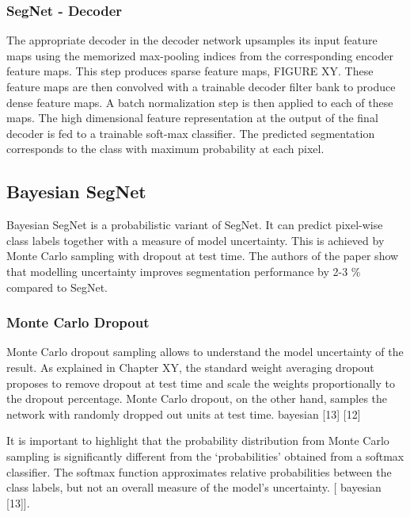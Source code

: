 \subsubsection{SegNet - Decoder}

The appropriate decoder in the decoder network upsamples its input feature maps using the memorized max-pooling indices from the corresponding encoder feature maps. This step produces sparse feature maps, FIGURE XY. These feature maps are then convolved with a trainable decoder filter bank to produce dense feature maps. A batch normalization step is then applied to each of these maps. The high dimensional feature representation at the output of the final decoder is fed to a trainable soft-max classifier. The predicted segmentation corresponds to the class with maximum probability at each pixel.

\subsection{Bayesian SegNet}

Bayesian SegNet is a probabilistic variant of SegNet. It can predict pixel-wise class labels together with a measure of model uncertainty.  This is achieved by Monte Carlo sampling with dropout at test time. The authors of the paper show that modelling uncertainty improves segmentation performance by 2-3 \% compared to SegNet.

\subsubsection{Monte Carlo Dropout}

Monte Carlo dropout sampling allows to understand the model uncertainty of the result. As explained in Chapter XY, the standard weight averaging dropout proposes to remove dropout at test time and scale the weights proportionally to the dropout percentage. Monte Carlo dropout, on the other hand, samples the network with randomly dropped out units at test time. bayesian [13] [12]

It is important to highlight that the probability distribution from Monte Carlo sampling is significantly different from the ‘probabilities’ obtained from a softmax classifier. The softmax function approximates relative probabilities between the class labels, but not an overall measure of the model’s uncertainty. [ bayesian [13]].





